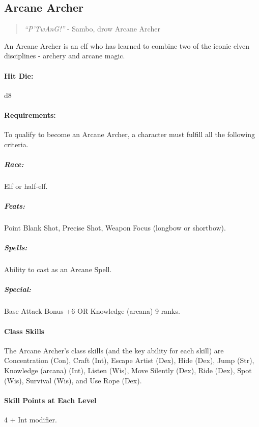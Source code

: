\subsection{Arcane Archer}
\begin{quote}
\emph{``P'TwAnG!''}
- Sambo, drow Arcane Archer
\end{quote}
An Arcane Archer is an elf who has learned to combine two of the iconic elven disciplines - archery and arcane magic.
\paragraph{Hit Die:} d8
\paragraph{Requirements:}
To qualify to become an Arcane Archer, a character must fulfill all the following criteria.
\subparagraph{Race:}
Elf or half-elf.
\subparagraph{Feats:}
Point Blank Shot, Precise Shot, Weapon Focus (longbow or shortbow).
\subparagraph{Spells:}
Ability to cast  as an Arcane Spell.
\subparagraph{Special:}
Base Attack Bonus +6 OR Knowledge (arcana) 9 ranks.
\paragraph{Class Skills}
The Arcane Archer's class skills (and the key ability for each skill) are Concentration (Con), Craft (Int), Escape Artist (Dex), Hide (Dex), Jump (Str), Knowledge (arcana) (Int), Listen (Wis), Move Silently (Dex), Ride (Dex), Spot (Wis), Survival (Wis), and Use Rope (Dex).
\paragraph{Skill Points at Each Level}
4 + Int modifier.

